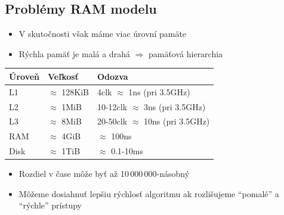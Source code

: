 \documentclass{beamer}
\begin{document}
\subsection{Problémy RAM modelu}
\begin{frame}
    \begin{itemize}
        \item V skutočnosti však máme viac úrovní pamäte
        \item Rýchla pamäť je malá a drahá $\Rightarrow$ pamäťová hierarchia
    \end{itemize}
    \begin{center}
		\begin{tabular}{|l|l|l|}
			\hline
			Úroveň & Veľkosť & Odozva \\ \hline
			L1 & $\approx$ 128KiB & 4clk $\approx$ 1ns (pri 3.5GHz) \\ \hline
			L2 & $\approx$ 1MiB & 10-12clk $\approx$ 3ns (pri 3.5GHz) \\ \hline
			L3 & $\approx$ 8MiB & 20-50clk $\approx$ 10ns (pri 3.5GHz) \\ \hline
			RAM & $\approx$ 4GiB & $\approx$ 100ns \\ \hline
			Disk & $\approx$ 1TiB & $\approx$ 0.1-10ms \\
			\hline
		\end{tabular}
	\end{center}
	\begin{itemize}
	    \item Rozdiel v čase môže byť až 10\,000\,000-násobný
	    \item Môžeme dosiahnuť lepšiu rýchlosť algoritmu ak rozlišujeme ``pomalé'' a ``rýchle'' prístupy
	\end{itemize}
\end{frame}
\end{document}
